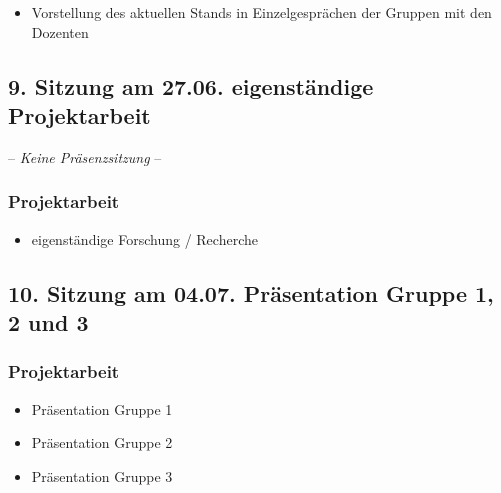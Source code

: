 \documentclass[
  ngerman,
]{article}
\providecommand{\tightlist}{%
  \setlength{\itemsep}{0pt}\setlength{\parskip}{0pt}}
\begin{document}
\begin{itemize}
\tightlist
\item
  Vorstellung des aktuellen Stands in Einzelgesprächen der Gruppen mit den Dozenten
\end{itemize}

\hypertarget{sitzung-am-27.06.-eigenstuxe4ndige-projektarbeit}{%
\subsection*{9. Sitzung am 27.06. \textbar{} eigenständige Projektarbeit}\label{sitzung-am-27.06.-eigenstuxe4ndige-projektarbeit}}

-- \emph{Keine Präsenzsitzung} --

\hypertarget{projektarbeit-6}{%
\subsubsection*{Projektarbeit}\label{projektarbeit-6}}

\begin{itemize}
\tightlist
\item
  eigenständige Forschung / Recherche
\end{itemize}

\hypertarget{sitzung-am-04.07.-pruxe4sentation-gruppe-1-2-und-3}{%
\subsection*{10. Sitzung am 04.07. \textbar{} Präsentation Gruppe 1, 2 und 3}\label{sitzung-am-04.07.-pruxe4sentation-gruppe-1-2-und-3}}

\hypertarget{projektarbeit-7}{%
\subsubsection*{Projektarbeit}\label{projektarbeit-7}}

\begin{itemize}
\tightlist
\item
  Präsentation Gruppe 1
\item
  Präsentation Gruppe 2
\item
  Präsentation Gruppe 3
\end{itemize}
\end{document}
